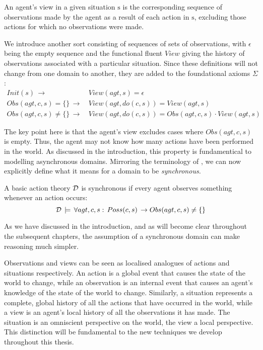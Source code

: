 \begin{defnL}
[{Views}] An agent's view in a given situation $\mathrm{s}$
is the corresponding sequence of observations made by the agent as
a result of each action in $\mathrm{s}$, excluding those actions
for which no observations were made. 
\end{defnL}
We introduce another sort  consisting of sequences of
sets of observations, with $\epsilon$ being the empty sequence and
the functional fluent $View$ giving the history of observations associated
with a particular situation. Since these definitions will not change
from one domain to another, they are added to the foundational axioms
$\Sigma$:\begin{align}
Init(s)\,\rightarrow & \, View(agt,s)=\epsilon\nonumber \\
Obs(agt,c,s)=\{\}\,\rightarrow & \, View(agt,do(c,s))=View(agt,s)\nonumber \\
Obs(agt,c,s)\neq\{\}\,\rightarrow & \, View(agt,do(c,s))=Obs(agt,c,s)\cdot View(agt,s)\label{eq:view_defn}\end{align}


The key point here is that the agent's view excludes cases where $Obs(agt,c,s)$
is empty. Thus, the agent may not know how many actions have been
performed in the world. As discussed in the introduction, this property
is fundamentical to modelling asynchronous domains. Mirroring the
terminology of \citet{vanBentham06tree_of_knowledge}, we can now
explicitly define what it means for a domain to be \emph{synchronous.}

\begin{defnL}
 A basic action theory $\mathcal{D}$ is
synchronous if every agent observes something whenever an action occurs:\[
\mathcal{D}\,\models\,\forall agt,c,s:\, Poss(c,s)\,\rightarrow Obs(agt,c,s)\neq\{\}\]

\end{defnL}
As we have discussed in the introduction, and as will become clear
throughout the subsequent chapters, the assumption of a synchronous
domain can make reasoning much simpler.

Observations and views can be seen as localised analogues of actions
and situations respectively. An action is a global event that causes
the state of the world to change, while an observation is an internal
event that causes an agent's knowledge of the state of the world to
change. Similarly, a situation represents a complete, global history
of all the actions that have occurred in the world, while a view is
an agent's local history of all the observations it has made. The
situation is an omniscient perspective on the world, the view a local
perspective. This distinction will be fundamental to the new techniques
we develop throughout this thesis.


